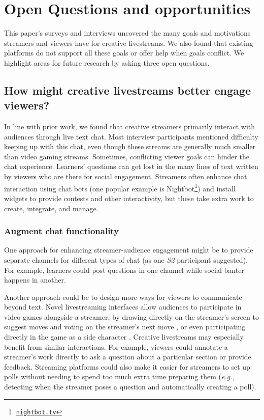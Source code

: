 \section{Open Questions and opportunities}
This paper's surveys and interviews uncovered the many goals and motivations streamers and viewers have for creative live\-streams. We also found that existing platforms do not support all these goals or offer help when goals conflict. We highlight areas for future research by asking three open questions.

\subsection{How might creative livestreams better engage viewers?}
In line with prior work, we found that creative streamers primarily interact with audiences through live text chat. Most interview participants mentioned difficulty keeping up with this chat, even though these streams are generally much smaller than video gaming streams. Sometimes, conflicting viewer goals can hinder the chat experience. Learners' questions can get lost in the many lines of text written by viewers who are there for social engagement. 
Streamers often enhance chat interaction using chat bots (one popular example is Nightbot\footnote{\href{https://nightbot.tv/}{\nolinkurl{nightbot.tv}}}) and install widgets to provide contests and other interactivity, but these take extra work to create, integrate, and manage.

\subsubsection{Augment chat functionality}
One approach for enhancing streamer-audience engagement might be to provide separate channels for different types of chat (as one \textit{S2} participant suggested). For example, learners could post questions in one channel while social banter happens in another.

Another approach could be to design more ways for viewers to communicate beyond text. Novel livestreaming interfaces allow audiences to participate in video games alongside a streamer, by drawing directly on the streamer's screen to suggest moves and voting on the streamer's next move \cite{Lessel2017}, or even participating directly in the game as a side character \cite{Glickman2018}. Creative livestreams may especially benefit from similar interactions. For example, viewers could annotate a streamer's work directly to ask a question about a particular section or provide feedback. Streaming platforms could also make it easier for streamers to set up polls without needing to spend too much extra time preparing them (\textit{e.g.,} detecting when the streamer poses a question and automatically creating a poll).

